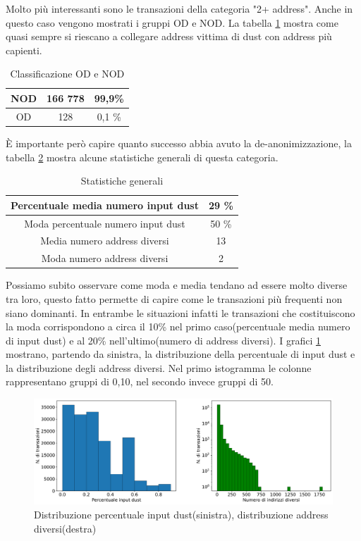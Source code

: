 Molto più interessanti sono le transazioni della categoria "2+ address". Anche in questo caso vengono mostrati i gruppi OD e NOD. La tabella \ref{tab:OD_NOD_success} mostra come quasi sempre si riescano a collegare address vittima di dust con address più capienti.
\begin{table}[H]
    \centering
    \begin{tabular}{|c|c|c|}
        \hline
            NOD  & 166 778 & 99,9\%\\
        \hline 
            OD  & 128 & 0,1 \%\\
        \hline
    \end{tabular}
    \caption{Classificazione OD e NOD}
    \label{tab:OD_NOD_success}
\end{table}
È importante però capire quanto successo abbia avuto la de-anonimizzazione, la tabella \ref{tab:stat} mostra alcune statistiche generali di questa categoria. 
\begin{table}[H]
    \centering
    \begin{tabular}{|c|c|}
        \hline
            Percentuale media numero input dust & 29 \%\\
        \hline
            Moda percentuale numero input dust & 50 \%\\ %
        \hline
            Media numero address diversi & 13\\
        \hline
            Moda numero address diversi & 2\\ %
        \hline
    \end{tabular}
    \caption{Statistiche generali}
    \label{tab:stat}
\end{table}
Possiamo subito osservare come moda e media tendano ad essere molto diverse tra loro, questo fatto permette di capire come le transazioni più frequenti non siano dominanti. In entrambe le situazioni infatti le transazioni che costituiscono la moda corrispondono a circa il 10\% nel primo caso(percentuale media numero di input dust) e al 20\% nell'ultimo(numero di address diversi). I grafici \ref{fig:distribuzioni_tx} mostrano, partendo da sinistra, la distribuzione della percentuale di input dust e la distribuzione degli address diversi. Nel primo istogramma le colonne rappresentano gruppi di 0,10, nel secondo invece gruppi di 50.
 \begin{figure}[h!]
     \centering
     \includegraphics[scale=0.44]{Grafici/Distribuzioni_belle.pdf}
     \caption{Distribuzione percentuale input dust(sinistra), distribuzione address diversi(destra)}
    \label{fig:distribuzioni_tx}
 \end{figure}
